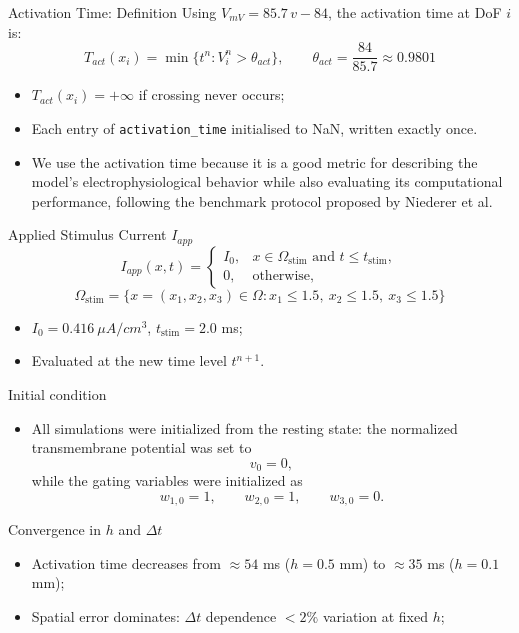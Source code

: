 \documentclass{beamer}
\begin{document}
\begin{frame}{Activation Time: Definition}
Using $V_{mV} = 85.7\,v - 84$, the activation time at DoF $i$ is:
\[
T_{act}(x_i) = \min\{t^n : V_i^n > \theta_{act}\}, \qquad
\theta_{act} = \frac{84}{85.7}\approx 0.9801
\]
\begin{itemize}
  \item $T_{act}(x_i) = +\infty$ if crossing never occurs;
  \item Each entry of \texttt{activation\_time} initialised to NaN, written exactly once.
  \item We use the activation time because it is a good metric for describing the model's electrophysiological behavior while also evaluating its computational performance, following the benchmark protocol proposed by Niederer et al.
\end{itemize}
\end{frame}
\begin{frame}{Applied Stimulus Current $I_{app}$}
\[
I_{app}(x,t) =
\begin{cases}
I_0, & x\in\Omega_{\text{stim}} \text{ and } t\le t_{\text{stim}}, \\
0, & \text{otherwise},
\end{cases}
\]
\[
\Omega_{\text{stim}} = \{x=(x_1,x_2,x_3)\in\Omega : x_1\le 1.5,\ x_2\le 1.5,\ x_3\le 1.5\}
\]
\begin{itemize}
  \item $I_0 = 0.416\ \mu A/cm^3$, $t_{\text{stim}} = 2.0$ ms;
  \item Evaluated at the new time level $t^{n+1}$.
   
\end{itemize}
\end{frame}
\begin{frame}{Initial condition}

\begin{itemize}
    \item All simulations were initialized from the resting state: the normalized transmembrane potential was set to
\[
v_0 = 0,
\]
while the gating variables were initialized as
\[
w_{1,0}=1,\qquad
w_{2,0}=1,\qquad
w_{3,0}=0.
\]
\end{itemize}
\end{frame}

\begin{frame}{Convergence in $h$ and $\Delta t$}
\begin{itemize}
  \item Activation time decreases from $\approx 54$ ms ($h=0.5$ mm) to $\approx 35$ ms ($h=0.1$ mm);
  \item Spatial error dominates: $\Delta t$ dependence $<2\%$ variation at fixed $h$;
\end{itemize}
\end{frame}
\end{document}
